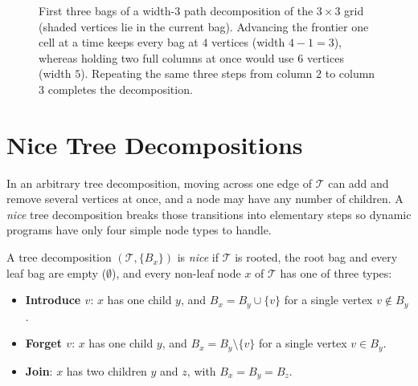 \begin{figure}[htbp]
\caption{First three bags of a width-$3$ path decomposition of the $3\times 3$ grid (shaded vertices lie in the current bag). Advancing the frontier one cell at a time keeps every bag at $4$ vertices (width $4-1=3$), whereas holding two full columns at once would use $6$ vertices (width $5$). Repeating the same three steps from column $2$ to column $3$ completes the decomposition.}
\label{ch24:fig-grid-wavefront}
\end{figure}

\section{Nice Tree Decompositions}
\label{ch24:nice}

In an arbitrary tree decomposition, moving across one edge of $\mathcal{T}$ can add
and remove several vertices at once, and a node may have any number of children. A
\emph{nice} tree decomposition breaks those transitions into elementary steps so
dynamic programs have only four simple node types to handle.

\begin{definition}
\label{ch24:def-nice}
A tree decomposition $(\mathcal{T},\{B_x\})$ is \emph{nice} if $\mathcal{T}$ is
rooted, the root bag and every leaf bag are empty ($\emptyset$), and every non-leaf
node $x$ of $\mathcal{T}$ has one of three types:
\begin{itemize}
  \item \textbf{Introduce $v$}: $x$ has one child $y$, and $B_x = B_y\cup\{v\}$ for a
        single vertex $v\notin B_y$.
  \item \textbf{Forget $v$}: $x$ has one child $y$, and $B_x = B_y\setminus\{v\}$ for a
        single vertex $v\in B_y$.
  \item \textbf{Join}: $x$ has two children $y$ and $z$, with $B_x = B_y = B_z$.
\end{itemize}
\end{definition}

